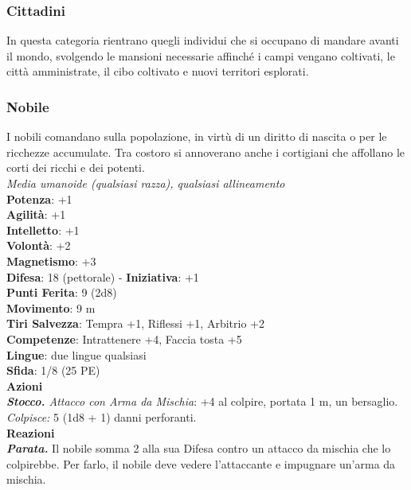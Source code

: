 \begin{multicols}{2}
\subsubsection{Cittadini}

In questa categoria rientrano quegli individui che si occupano di mandare avanti il mondo, svolgendo le mansioni necessarie affinché i campi vengano coltivati, le città amministrate, il cibo coltivato e nuovi territori esplorati.

\subsubsection{Nobile}

I nobili comandano sulla popolazione, in virtù di un diritto di nascita o per le ricchezze accumulate. Tra costoro si annoverano anche i cortigiani che affollano le corti dei ricchi e dei potenti.\\
\emph{Media umanoide (qualsiasi razza), qualsiasi allineamento}\\
\textbf{Potenza}: +1\\
\textbf{Agilità}: +1\\
\textbf{Intelletto}: +1\\
\textbf{Volontà}: +2\\
\textbf{Magnetismo}: +3\\
\textbf{Difesa}: 18 (pettorale) - \textbf{Iniziativa}: +1\\
\textbf{Punti Ferita}: 9 (2d8)\\
\textbf{Movimento}: 9 m\\
\textbf{Tiri Salvezza}: Tempra +1, Riflessi +1, Arbitrio +2 \\
\textbf{Competenze}: Intrattenere +4, Faccia tosta +5\\
\textbf{Lingue}: due lingue qualsiasi\\
\textbf{Sfida}: 1/8 (25 PE)\smallskip\\
\smallskip\textbf{Azioni}\\
\emph{\textbf{Stocco.} Attacco con Arma da Mischia}: +4 al colpire, portata 1 m, un bersaglio.\\
\emph{Colpisce:} 5 (1d8 + 1) danni perforanti.\\
\textbf{Reazioni}\\
\emph{\textbf{Parata.}} Il nobile somma 2 alla sua Difesa contro un attacco da mischia che lo colpirebbe. Per farlo, il nobile deve vedere l'attaccante e impugnare un'arma da mischia.\\


\end{multicols}
